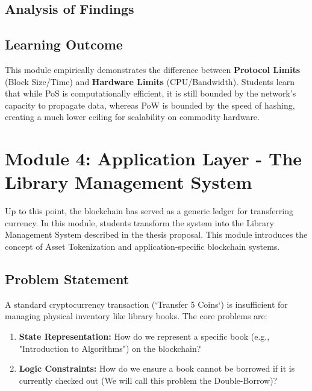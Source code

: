 \subsection{Analysis of Findings}

\subsection{Learning Outcome}
This module empirically demonstrates the difference between \textbf{Protocol Limits} (Block Size/Time) and \textbf{Hardware Limits} (CPU/Bandwidth). Students learn that while PoS is computationally efficient, it is still bounded by the network's capacity to propagate data, whereas PoW is bounded by the speed of hashing, creating a much lower ceiling for scalability on commodity hardware.

\newpage

\section{Module 4: Application Layer - The Library Management System} \label{ch5_module4}

Up to this point, the blockchain has served as a generic ledger for transferring currency.  In this module, students transform the system into the Library Management System described in the thesis proposal. This module introduces the concept of Asset Tokenization and application-specific blockchain systems.

\subsection{Problem Statement}
A standard cryptocurrency transaction (`Transfer 5 Coins`) is insufficient for managing physical inventory like library books. The core problems are:
\begin{enumerate}
    \item \textbf{State Representation:} How do we represent a specific book (e.g., "Introduction to Algorithms") on the blockchain?
    \item \textbf{Logic Constraints:} How do we ensure a book cannot be borrowed if it is currently checked out (We will call this problem the Double-Borrow)?
\end{enumerate}

